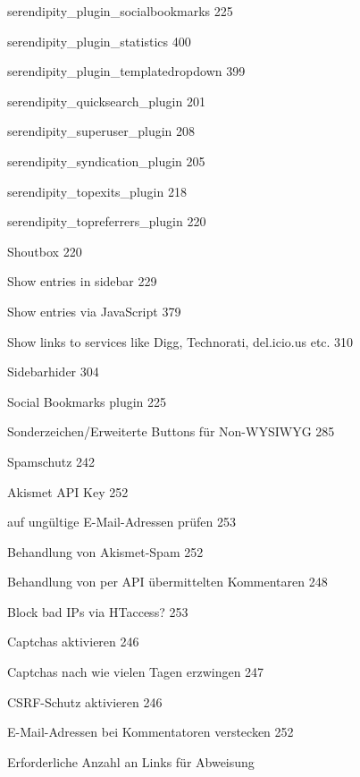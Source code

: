 \documentclass{book}
\renewcommand\subitem{\par}
\renewcommand\subsubitem{\par\hspace*{3mm}}
\begin{document}
\begin{multicols}{2}
\begin{osp-index}
    \subitem serendipity\_plugin\_socialbookmarks\hspace{1mm} 225
    \subitem serendipity\_plugin\_statistics\hspace{1mm} 400
    \subitem serendipity\_plugin\_templatedropdown\hspace{1mm} 399
    \subitem serendipity\_quicksearch\_plugin\hspace{1mm} 201
    \subitem serendipity\_superuser\_plugin\hspace{1mm} 208
    \subitem serendipity\_syndication\_plugin\hspace{1mm} 205
    \subitem serendipity\_topexits\_plugin\hspace{1mm} 218
    \subitem serendipity\_topreferrers\_plugin\hspace{1mm} 220
    \subitem Shoutbox\hspace{1mm} 220
    \subitem Show entries in sidebar\hspace{1mm} 229
    \subitem Show entries via JavaScript\hspace{1mm} 379
    \subitem Show links to services like Digg, Technorati, del.icio.us etc.\hspace{1mm} 
		310
    \subitem Sidebarhider\hspace{1mm} 304
    \subitem Social Bookmarks plugin\hspace{1mm} 225
    \subitem Sonderzeichen/Erweiterte Buttons f\"ur Non-WYSIWYG\hspace{1mm} 
		285
    \subitem Spamschutz\hspace{1mm} 242
      \subsubitem Akismet API Key\hspace{1mm} 252
      \subsubitem auf ung\"ultige E-Mail-Adressen pr\"ufen\hspace{1mm} 
		253
      \subsubitem Behandlung von Akismet-Spam\hspace{1mm} 252
      \subsubitem Behandlung von per API \"ubermittelten Kommentaren\hspace{1mm} 
		248
      \subsubitem Block bad IPs via HTaccess?\hspace{1mm} 253
      \subsubitem Captchas aktivieren\hspace{1mm} 246
      \subsubitem Captchas nach wie vielen Tagen erzwingen\hspace{1mm} 
		247
      \subsubitem CSRF-Schutz aktivieren\hspace{1mm} 246
      \subsubitem E-Mail-Adressen bei Kommentatoren verstecken\hspace{1mm} 
		252
      \subsubitem Erforderliche Anzahl an Links f\"ur Abweisung\hspace{1mm} 

\end{osp-index}
\end{multicols}
\end{document}
